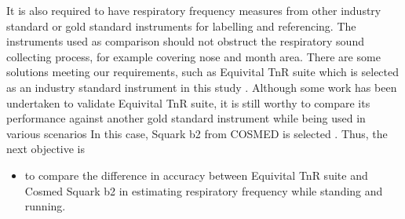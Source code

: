 It is also required to have respiratory frequency measures from other industry standard or gold standard instruments for labelling and referencing. The instruments used as comparison should not obstruct the respiratory sound collecting process, for example covering nose and month area. There are some solutions meeting our requirements, such as Equivital TnR suite which is selected as an industry standard instrument in this study \cite{equivital}. Although some work has been undertaken to validate Equivital TnR suite, it is still worthy to compare its performance against another gold standard instrument while being used in various scenarios In this case, Squark b2 from COSMED is selected \cite{cosmed}. Thus, the next objective is 
\begin{itemize}
\item to compare the difference in accuracy between Equivital TnR suite and Cosmed Squark b2 in estimating respiratory frequency while standing and running. 
\end{itemize}